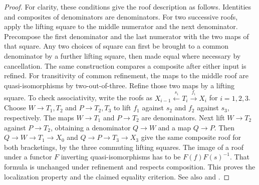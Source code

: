 \begin{proof}
For clarity, these conditions give the roof description as follows.
Identities and composites of denominators are denominators. For two
successive roofs, apply the lifting square to the middle numerator and
the next denominator. Precompose the first denominator and the last
numerator with the two maps of that square. Any two choices of square
can first be brought to a common denominator by a further lifting
square, then made equal where necessary by cancellation. The same
construction compares a composite after either input is refined.
For transitivity of common refinement, the maps to the middle roof
are quasi-isomorphisms by two-out-of-three. Refine those two maps by a
lifting square. To check associativity, write the roofs as
\(X_{i-1}\xleftarrow{s_i}T_i\xrightarrow{f_i}X_i\) for \(i=1,2,3\).
Choose \(W\to T_1,T_2\) and \(P\to T_2,T_3\) to lift \(f_1\)
against \(s_2\) and \(f_2\) against \(s_3\), respectively.
The maps \(W\to T_1\) and \(P\to T_2\) are denominators.
Next lift \(W\to T_2\) against \(P\to T_2\), obtaining a
denominator \(Q\to W\) and a map \(Q\to P\).
Then \(Q\to W\to T_1\to X_0\) and \(Q\to P\to T_3\to X_3\)
give the same composite roof for both bracketings, by the three
commuting lifting squares. The image of a
roof under a functor \(F\) inverting quasi-isomorphisms has to be
\(F(f)F(s)^{-1}\). That formula is unchanged under refinement and
respects composition. This proves the localization property and
the claimed equality criterion. See also
\cite[Tags 05R2, 05R6, and 05RU]{stacks-derived} and
\cite[Sections 6.1--6.2]{yekutieli}.
\end{proof}


